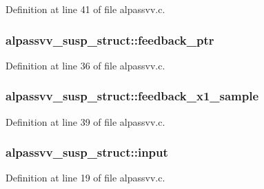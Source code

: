 Definition at line 41 of file alpassvv.\+c.

\subsubsection[{\texorpdfstring{feedback\+\_\+ptr}{feedback_ptr}}]{ alpassvv\+\_\+susp\+\_\+struct\+::feedback\+\_\+ptr}\hypertarget{structalpassvv__susp__struct_a08c63d19964ffc464a85ebe55c01a2eb}{}\label{structalpassvv__susp__struct_a08c63d19964ffc464a85ebe55c01a2eb}


Definition at line 36 of file alpassvv.\+c.

\subsubsection[{\texorpdfstring{feedback\+\_\+x1\+\_\+sample}{feedback_x1_sample}}]{ alpassvv\+\_\+susp\+\_\+struct\+::feedback\+\_\+x1\+\_\+sample}\hypertarget{structalpassvv__susp__struct_a036d13841499140d5dbd953660ba5aac}{}\label{structalpassvv__susp__struct_a036d13841499140d5dbd953660ba5aac}


Definition at line 39 of file alpassvv.\+c.

\subsubsection[{\texorpdfstring{input}{input}}]{ alpassvv\+\_\+susp\+\_\+struct\+::input}\hypertarget{structalpassvv__susp__struct_a1400c2cdacdb5f4290a45a4e6f0c5e02}{}\label{structalpassvv__susp__struct_a1400c2cdacdb5f4290a45a4e6f0c5e02}


Definition at line 19 of file alpassvv.\+c.

